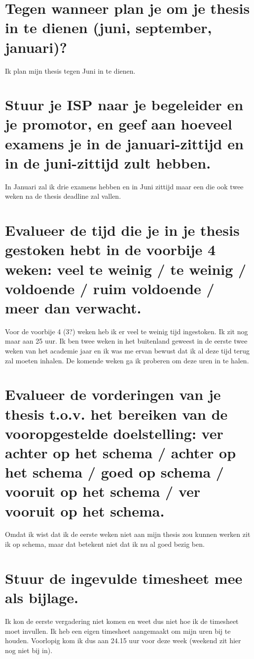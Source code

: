 \documentclass[a4paper, 11pt]{article}
\begin{document}
\section{Tegen wanneer plan je om je thesis in te dienen (juni, september, januari)?}
Ik plan mijn thesis tegen Juni in te dienen.
\section{Stuur je ISP naar je begeleider en je promotor, en geef aan hoeveel examens je in de januari-zittijd en in de juni-zittijd zult hebben.}
In Januari zal ik drie examens hebben en in Juni zittijd maar een die ook twee weken na de thesis deadline zal vallen.
\section{Evalueer de tijd die je in je thesis gestoken hebt in de voorbije 4 weken: veel te weinig / te weinig / voldoende / ruim voldoende / meer dan verwacht.}
Voor de voorbije 4 (3?) weken heb ik er veel te weinig tijd ingestoken. Ik zit nog maar aan 25 uur. Ik ben twee weken in het buitenland geweest in de eerste twee weken van het academie jaar en ik was me ervan bewust dat ik al deze tijd terug zal moeten inhalen. De komende weken ga ik proberen om deze uren in te halen.
\section{Evalueer de vorderingen van je thesis t.o.v. het bereiken van de vooropgestelde doelstelling: ver achter op het schema / achter op het schema / goed op schema / vooruit op het schema / ver vooruit op het schema.}
Omdat ik wist dat ik de eerste weken niet aan mijn thesis zou kunnen werken zit ik op schema, maar dat betekent niet dat ik nu al goed bezig ben. 
\section{Stuur de ingevulde timesheet mee als bijlage.}
Ik kon de eerste vergadering niet komen en weet dus niet hoe ik de timesheet moet invullen. Ik heb een eigen timesheet aangemaakt om mijn uren bij te houden.
Voorlopig kom ik dus aan 24.15 uur voor deze week (weekend zit hier nog niet bij in).
\end{document}
